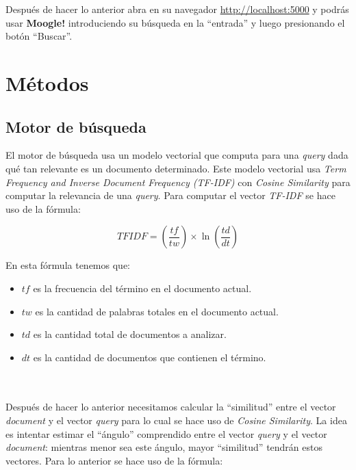 \documentclass[a4paper, 12pt]{report}
\begin{document}
Después de hacer lo anterior abra en su navegador
\href{http://localhost:5000}{http://localhost:5000} y podrás usar {\bf Moogle!}
introduciendo su búsqueda en la ``entrada'' y luego presionando el botón
``Buscar''.

\section*{Métodos}

\subsection*{Motor de búsqueda}

El motor de búsqueda usa un modelo vectorial que computa para una {\it query}
dada qué tan relevante es un documento determinado. Este modelo vectorial usa
	{\it Term Frequency and Inverse Document Frequency (TF-IDF)} con {\it Cosine
		Similarity} para computar la relevancia de una {\it query}. Para computar el
vector {\it TF-IDF} se hace uso de la fórmula:

\begin{equation}
	TFIDF = (\frac{tf}{tw}) \times \ln(\frac{td}{dt})
\end{equation}

En esta fórmula tenemos que:
\begin{itemize}
	\item $tf$ es la frecuencia del término en el documento actual.
	\item $tw$ es la cantidad de palabras totales en el documento actual.
	\item $td$ es la cantidad total de documentos a analizar.
	\item $dt$ es la cantidad de documentos que contienen el término.
\end{itemize}

\\ \\

Después de hacer lo anterior necesitamos calcular la ``similitud'' entre el
vector {\it document} y el vector {\it query} para lo cual se hace uso de {\it
		Cosine Similarity}. La idea es intentar estimar el ``ángulo'' comprendido entre
el vector {\it query} y el vector {\it document}: mientras menor sea este
ángulo, mayor ``similitud'' tendrán estos vectores. Para lo anterior se hace
uso de la fórmula:
\end{document}
